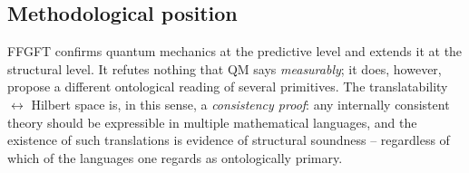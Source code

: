 \subsection*{Methodological position}

FFGFT confirms quantum mechanics at the predictive level and extends
it at the structural level. It refutes nothing that QM says
\emph{measurably}; it does, however, propose a different ontological
reading of several primitives. The translatability $\leftrightarrow$
Hilbert space is, in this sense, a \emph{consistency proof}: any
internally consistent theory should be expressible in multiple
mathematical languages, and the existence of such translations is
evidence of structural soundness -- regardless of which of the
languages one regards as ontologically primary.
